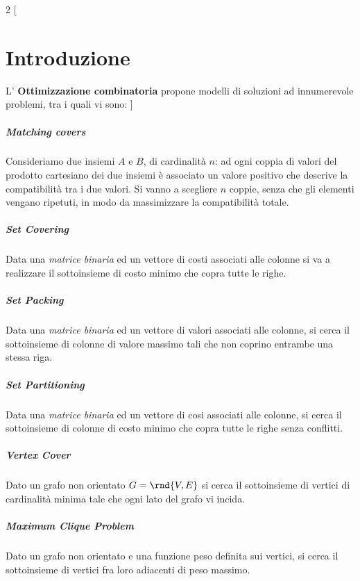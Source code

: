 \documentclass[\main/main.tex]{subfiles}
\begin{document}
\begin{multicols}{2}
  [
    \chapter{Introduzione}
    L' \textbf{Ottimizzazione combinatoria} propone modelli di soluzioni ad innumerevole problemi, tra i quali vi sono:
  ]
  \paragraph*{Matching covers}
  Consideriamo due insiemi \(A\) e \(B\), di cardinalità \(n\): ad ogni coppia di valori del prodotto cartesiano dei due insiemi è associato un valore positivo che descrive la compatibilità tra i due valori. Si vanno a scegliere \(n\) coppie, senza che gli elementi vengano ripetuti, in modo da massimizzare la compatibilità totale.

  \paragraph*{Set Covering}
  Data una \textit{matrice binaria} ed un vettore di costi associati alle colonne si va a realizzare il sottoinsieme di costo minimo che copra tutte le righe.

  \paragraph*{Set Packing}
  Data una \textit{matrice binaria} ed un vettore di valori associati alle colonne, si cerca il sottoinsieme di colonne di valore massimo tali che non coprino entrambe una stessa riga.

  \paragraph*{Set Partitioning}
  Data una \textit{matrice binaria} ed un vettore di cosi associati alle colonne, si cerca il sottoinsieme di colonne di costo minimo che copra tutte le righe senza conflitti.

  \paragraph*{Vertex Cover}
  Dato un grafo non orientato \(G=\rnd{V, E}\) si cerca il sottoinsieme di vertici di cardinalità minima tale che ogni lato del grafo vi incida.

  \paragraph*{Maximum Clique Problem}
  Dato un grafo non orientato e una funzione peso definita sui vertici, si cerca il sottoinsieme di vertici fra loro adiacenti di peso massimo.


\end{multicols}
\end{document}
